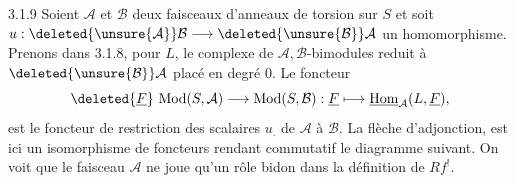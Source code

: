 3.1.9 Soient $\mathcal A$ et $\mathcal B$  deux faisceaux d'anneaux de torsion sur $S$ et soit $u:\deleted{\unsure{\mathcal A}}\mathcal B\longrightarrow\deleted{\unsure{\mathcal B}}\mathcal A$ un homomorphisme. Prenons dans 3.1.8, pour $L$, le complexe de $\mathcal A,\mathcal B$-bimodules  reduit à $\deleted{\unsure{\mathcal B}}\mathcal A$ placé en degré 0. Le foncteur
\[
 \deleted{\underline F}\ \mathrm{Mod}(S,\mathcal A)\longrightarrow\mathrm{Mod}(S,\mathcal B):
 \underline F\longmapsto\underline{\mathrm{Hom}}_{\mathcal A}(L,\underline F),
\]
est le foncteur de restriction des scalaires $u_{.}$ de $\mathcal A$ à $\mathcal B$. La flèche d'adjonction, est ici un isomorphisme de foncteurs rendant commutatif le diagramme suivant.
On voit que le faisceau $\mathcal A$ ne joue qu'un rôle bidon dans la définition de $Rf^!$.
